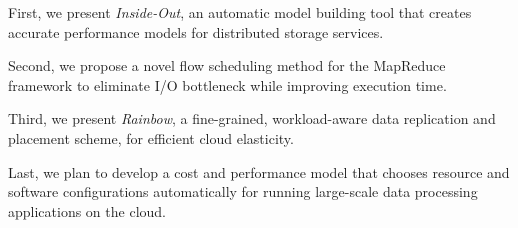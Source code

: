 First, we present \textit{Inside-Out}, an automatic model building tool that creates
accurate performance models for distributed storage services.

Second, we propose a novel flow scheduling method for the MapReduce framework
to eliminate I/O bottleneck while improving execution time.

Third, we present \textit{Rainbow}, a fine-grained, workload-aware
data replication and placement scheme, for efficient cloud elasticity.

Last, we plan to develop a cost and performance model that chooses
resource and software configurations automatically
for running large-scale data processing applications on the cloud.

\fi
